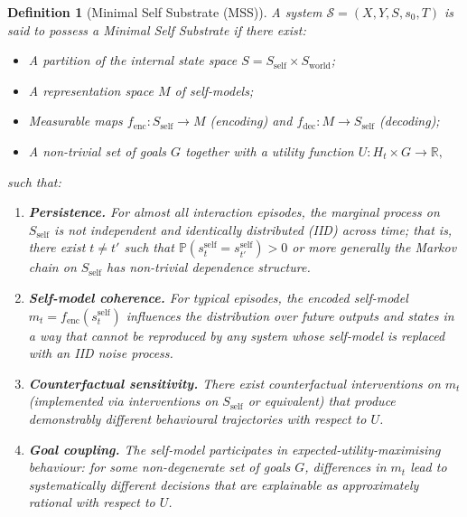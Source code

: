 \documentclass[11pt]{article}
\newtheorem{definition}{Definition}
\newcommand{\R}{\mathbb{R}}
\newcommand{\Pp}{\mathbb{P}}
\newcommand{\1}{\mathbf{1}}
\begin{document}
\begin{definition}[Minimal Self Substrate (MSS)]
A system $\mathcal{S} = (X, Y, S, s_0, T)$ is said to possess a
\emph{Minimal Self Substrate} if there exist:
\begin{itemize}[leftmargin=2em]
  \item A partition of the internal state space $S = S_{\text{self}}
  \times S_{\text{world}}$;
  \item A representation space $M$ of self-models;
  \item Measurable maps
  \(
    f_{\text{enc}} : S_{\text{self}} \to M
  \)
  (encoding) and
  \(
    f_{\text{dec}} : M \to S_{\text{self}}
  \)
  (decoding);
  \item A non-trivial set of goals $G$ together with a utility function
  \(
    U : H_t \times G \to \R,
  \)
\end{itemize}
such that:

\begin{enumerate}[label=(\alph*),leftmargin=2em]
  \item \textbf{Persistence.}
  For almost all interaction episodes, the marginal process on
  $S_{\text{self}}$ is not independent and identically distributed (IID)
  across time; that is, there exist $t \ne t'$ such that
  \(
    \Pp(s^{\text{self}}_t = s^{\text{self}}_{t'}) > 0
  \)
  or more generally the Markov chain on $S_{\text{self}}$ has non-trivial
  dependence structure.

  \item \textbf{Self-model coherence.}
  For typical episodes, the encoded self-model $m_t = f_{\text{enc}}(s^{\text{self}}_t)$
  influences the distribution over future outputs and states in a way that
  cannot be reproduced by any system whose self-model is replaced with an IID
  noise process.

  \item \textbf{Counterfactual sensitivity.}
  There exist counterfactual interventions on $m_t$ (implemented via
  interventions on $S_{\text{self}}$ or equivalent) that produce demonstrably
  different behavioural trajectories with respect to $U$.

  \item \textbf{Goal coupling.}
  The self-model participates in expected-utility-maximising behaviour:
  for some non-degenerate set of goals $G$, differences in $m_t$ lead to
  systematically different decisions that are explainable as approximately
  rational with respect to $U$.
\end{enumerate}
\end{definition}
\end{document}
